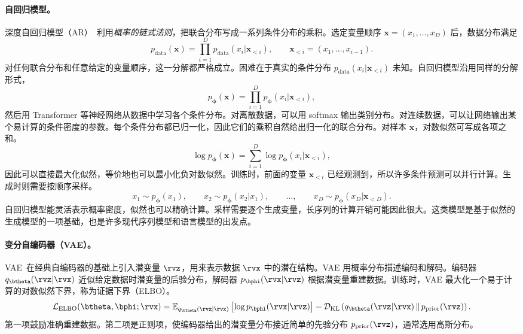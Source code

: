 \paragraph{自回归模型。}
深度自回归模型（AR）~\citep{frey1995does,larochelle2011neural,uria2016neural}利用\emph{概率的链式法则}，把联合分布写成一系列条件分布的乘积。选定变量顺序 $\mathbf{x}=(x_1,\ldots,x_D)$ 后，数据分布满足
\begin{equation*}
    p_{\mathrm{data}}(\mathbf{x})
    =
    \prod_{i=1}^{D}
    p_{\mathrm{data}}(x_i | \mathbf{x}_{<i}),
    \qquad
    \mathbf{x}_{<i}=(x_1,\ldots,x_{i-1}).
\end{equation*}
对任何联合分布和任意给定的变量顺序，这一分解都严格成立。困难在于真实的条件分布 $p_{\mathrm{data}}(x_i|\mathbf{x}_{<i})$ 未知。自回归模型沿用同样的分解形式，
\begin{equation*}
    p_{\bm{\phi}}(\mathbf{x})
    =
    \prod_{i=1}^{D}
    p_{\bm{\phi}}(x_i|\mathbf{x}_{<i}),
\end{equation*}
然后用 Transformer 等神经网络从数据中学习各个条件分布。对离散数据，可以用 softmax 输出类别分布。对连续数据，可以让网络输出某个易计算的条件密度的参数。每个条件分布都已归一化，因此它们的乘积自然给出归一化的联合分布。对样本 $\mathbf{x}$，对数似然可写成各项之和。
\begin{equation*}
    \log p_{\bm{\phi}}(\mathbf{x})
    =
    \sum_{i=1}^{D}
    \log p_{\bm{\phi}}(x_i|\mathbf{x}_{<i}),
\end{equation*}
因此可以直接最大化似然，等价地也可以最小化负对数似然。训练时，前面的变量 $\mathbf{x}_{<i}$ 已经观测到，所以许多条件预测可以并行计算。生成时则需要按顺序采样。
\begin{equation*}
    x_1 \sim p_{\bm{\phi}}(x_1),
    \qquad
    x_2 \sim p_{\bm{\phi}}(x_2| x_1),
    \qquad
    \ldots,
    \qquad
    x_D \sim p_{\bm{\phi}}(x_D|\mathbf{x}_{<D}).
\end{equation*}
自回归模型能灵活表示概率密度，似然也可以精确计算。采样需要逐个生成变量，长序列的计算开销可能因此很大。这类模型是基于似然的生成模型的一项基础，也是许多现代序列模型和语言模型的出发点。


\paragraph{变分自编码器（VAE）。}
VAE~\citep{kingma2013auto}在经典自编码器的基础上引入潜变量 $\rvz$，用来表示数据 $\rvx$ 中的潜在结构。VAE 用概率分布描述编码和解码。编码器 $q_{\btheta}(\rvz|\rvx)$ 近似给定数据时潜变量的后验分布，解码器 $p_{\bphi}(\rvx|\rvz)$ 根据潜变量重建数据。训练时，VAE 最大化一个易于计算的对数似然下界，称为证据下界（ELBO）。
\begin{equation*}
    \mathcal{L}_{\text{ELBO}}(\btheta, \bphi; \rvx) 
    = \mathbb{E}_{q_{\btheta}(\rvz | \rvx)} \left[ \log p_{\bphi}(\rvx | \rvz) \right] 
    - \mathcal D_{\mathrm{KL}} \left( q_{\btheta}(\rvz | \rvx) \,\|\, p_{\mathrm{prior}}(\rvz) \right).
\end{equation*}
第一项鼓励准确重建数据。第二项是正则项，使编码器给出的潜变量分布接近简单的先验分布 $p_{\mathrm{prior}}(\rvz)$，通常选用高斯分布。

